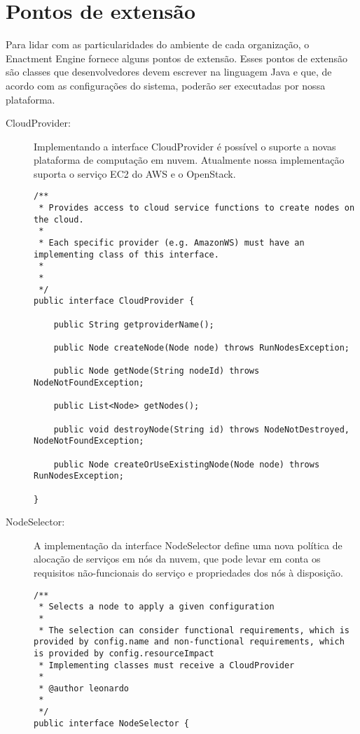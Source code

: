 \section{Pontos de extensão}
\label{sec:extensao}

Para lidar com as particularidades do ambiente de cada organização, o Enactment Engine fornece alguns pontos de extensão. Esses pontos de extensão são classes que desenvolvedores devem escrever na linguagem Java e que, de acordo com as configurações do sistema, poderão ser executadas por nossa plataforma.

\begin{description}

\item [CloudProvider:] 

Implementando a interface CloudProvider é possível o suporte a novas plataforma de computação em nuvem. Atualmente nossa implementação suporta o serviço EC2 do AWS e o OpenStack.

\begin{lstlisting}[frame=trbl, label=lst:cloud_provider, caption=Interface CloudProvider]
/**
 * Provides access to cloud service functions to create nodes on the cloud. 
 * 
 * Each specific provider (e.g. AmazonWS) must have an implementing class of this interface.
 * 
 * 
 */
public interface CloudProvider {

	public String getproviderName();
	
	public Node createNode(Node node) throws RunNodesException;

	public Node getNode(String nodeId) throws NodeNotFoundException;

	public List<Node> getNodes();

	public void destroyNode(String id) throws NodeNotDestroyed, NodeNotFoundException;

	public Node createOrUseExistingNode(Node node) throws RunNodesException;

}
\end{lstlisting}


\item [NodeSelector:]

A implementação da interface NodeSelector define uma nova política de alocação de serviços em nós da nuvem, que pode levar em conta os requisitos não-funcionais do serviço e propriedades dos nós à disposição.

\begin{lstlisting}[frame=trbl, label=lst:node_selector, caption=Interface NodeSelector]
/**
 * Selects a node to apply a given configuration
 * 
 * The selection can consider functional requirements, which is provided by config.name and non-functional requirements, which is provided by config.resourceImpact
 * Implementing classes must receive a CloudProvider
 * 
 * @author leonardo
 *
 */
public interface NodeSelector {


\end{lstlisting}
\end{description}
